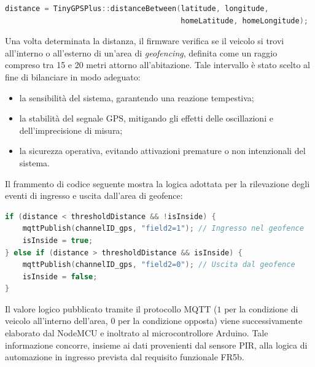\begin{lstlisting}[language=C++]
distance = TinyGPSPlus::distanceBetween(latitude, longitude,
                                        homeLatitude, homeLongitude);
\end{lstlisting}

Una volta determinata la distanza, il firmware verifica se il veicolo si trovi
all’interno o all’esterno di un’area di \textit{geofencing}, definita come un
raggio compreso tra 15 e 20 metri attorno all’abitazione. Tale intervallo è
stato scelto al fine di bilanciare in modo adeguato:
\begin{itemize}
    \item la sensibilità del sistema, garantendo una reazione tempestiva;
    \item la stabilità del segnale GPS, mitigando gli effetti delle oscillazioni
          e dell’imprecisione di misura;
    \item la sicurezza operativa, evitando attivazioni premature o non
          intenzionali del sistema.
\end{itemize}

Il frammento di codice seguente mostra la logica adottata per la rilevazione
degli eventi di ingresso e uscita dall’area di geofence:

\begin{lstlisting}[language=C++]
if (distance < thresholdDistance && !isInside) {
    mqttPublish(channelID_gps, "field2=1"); // Ingresso nel geofence
    isInside = true;
} else if (distance > thresholdDistance && isInside) {
    mqttPublish(channelID_gps, "field2=0"); // Uscita dal geofence
    isInside = false;
}
\end{lstlisting}

Il valore logico pubblicato tramite il protocollo MQTT ($1$ per la condizione
di veicolo all’interno dell’area, $0$ per la condizione opposta) viene
successivamente elaborato dal NodeMCU e inoltrato al microcontrollore Arduino.
Tale informazione concorre, insieme ai dati provenienti dal sensore PIR, alla
logica di automazione in ingresso prevista dal requisito funzionale FR5b.

